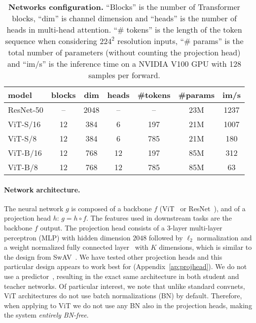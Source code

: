 \begin{table}[t]
\centering
\caption{\textbf{Networks configuration.}
``Blocks'' is the number of Transformer blocks, ``dim'' is channel dimension and ``heads'' is the number of heads in multi-head attention.
``\# tokens'' is the length of the token sequence when considering $224^2$ resolution inputs, ``\# params'' is the total number of parameters (without counting the projection head) and ``im/s'' is the inference time on a NVIDIA V100 GPU with 128 samples per forward.
}
	\label{tab:archs}
  \setlength{\tabcolsep}{2pt}
  \begin{tabular}{@{}l c c c c c c@{}}
\toprule
	  model & blocks & dim & heads & \#tokens & \#params & im/s \\
    \midrule
	  ResNet-50 & -- & 2048 & -- & -- & 23M & 1237 \\
	  ViT-S/16 & 12 & 384 & 6 & 197 & 21M & 1007 \\
	  ViT-S/8 & 12 & 384 & 6 & 785 & 21M & 180 \\
	  ViT-B/16 & 12 & 768 & 12 & 197 & 85M & 312 \\
	  ViT-B/8 & 12 & 768 & 12 & 785 & 85M & 63 \\
\bottomrule
  \end{tabular}
\end{table}


\paragraph{Network architecture.}
The neural network $g$ is composed of a backbone $f$ (ViT~\cite{dosovitskiy2020image} or ResNet~\cite{he2016deep}), and of a projection head $h$: $g = h \circ f$.
The features used in downstream tasks are the backbone $f$ output.
The projection head consists of a 3-layer multi-layer perceptron (MLP) with hidden dimension $2048$ followed by $\ell_2$ normalization and a weight normalized fully connected layer~\cite{salimans2016weight} with $K$ dimensions, which is similar to the design from SwAV~\cite{caron2020unsupervised}.
We have tested other projection heads and this particular design appears to work best for \OURS (Appendix~\ref{ap:projhead}).
We do not use a predictor~\cite{grill2020bootstrap, chen2020exploring}, resulting in the exact same architecture in both student and teacher networks.
Of particular interest, we note that unlike standard convnets, ViT architectures do not use batch normalizations (BN) by default.
Therefore, when applying \OURS to ViT we do not use any BN also in the projection heads, making the system \emph{entirely BN-free}.

